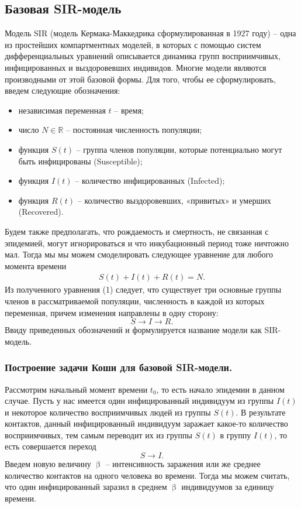 \documentclass[a4paper, 12pt]{extarticle}
\numberwithin{equation}{section}
\newcommand{\Rm}{\mathbb{R}}
\renewcommand{\beta}{\upbeta}
\begin{document}
	\subsection{Базовая SIR-модель}
	Модель SIR (модель Кермака-Маккедрика сформулированная в 1927 году) -- одна из простейших компартментных моделей, в которых с помощью систем дифференциальных уравнений описывается динамика групп восприимчивых, инфицированных и выздоровевших индивидов. Многие модели являются производными от этой базовой формы. Для того, чтобы ее сформулировать, введем следующие обозначения:
	\begin{itemize}
		\item независимая переменная $t$ -- время;
		\item число $N \in \Rm$ -- постоянная численность популяции;
		\item функция $S(t)$ -- группа членов популяции, которые потенциально могут быть инфицированы (Susceptible);
		\item функция $I(t)$ -- количество инфицированных (Infected);
		\item функция $R(t)$ -- количество выздоровевших, «привитых» и умерших (Recovered).
	\end{itemize}	
	Будем также предполагать, что рождаемость и смертность, не связанная с эпидемией, могут игнорироваться и что инкубационный период тоже ничтожно мал. Тогда мы мы можем смоделировать следующее уравнение для любого момента времени
	\begin{eqnarray}
		S(t) + I(t) + R(t) = N.
	\end{eqnarray}
	Из полученного уравнения (1) следует, что существует три основные группы членов в рассматриваемой
	популяции, численность в каждой из которых переменная, причем изменения
	направлены в одну сторону: $$S \to I \to R.$$
	Ввиду приведенных обозначений и формулируется название модели как SIR-модель. 
	
	\subsubsection{Построение задачи Коши для базовой SIR-модели.}
	Рассмотрим начальный момент времени $t_0$, то есть начало эпидемии в данном случае. Пусть у нас имеется один инфицированный индивидуум из группы $I(t)$ и некоторое количество восприимчивых людей из группы $S(t)$. В результате контактов, данный инфицированный индивидуум заражает какое-то количество восприимчивых, тем самым переводит их из группы $S(t)$ в группу $I(t)$, то есть совершается переход $$S \to I.$$
	Введем новую величину $\beta$ -- интенсивность заражения или же  среднее количество контактов на одного человека во времени. Тогда мы можем считать, что один инфицированный заразил в среднем $\beta$ индивидуумов за единицу времени.
	
\end{document}
